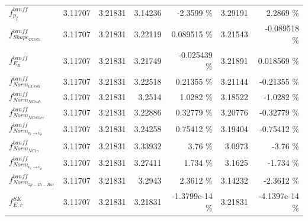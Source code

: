 \begin{table}
\begin{tabular}{| l | r | r | r  r | r  r |}
                                                             $f_{p_{f}}^{banff}$ &         3.11707 & 3.21831 & 3.14236 &         -2.3599 \%  &         3.29191 &          2.2869 \%  \\ 
                                                     $f_{Shape_{CCoth}}^{banff}$ &         3.11707 & 3.21831 & 3.22119 &        0.089515 \%  &         3.21543 &       -0.089518 \%  \\ 
                                                             $f_{E_{B}}^{banff}$ &         3.11707 & 3.21831 & 3.21749 &       -0.025439 \%  &         3.21891 &        0.018569 \%  \\ 
                                                      $f_{Norm_{CCcoh}}^{banff}$ &         3.11707 & 3.21831 & 3.22518 &         0.21355 \%  &         3.21144 &        -0.21355 \%  \\ 
                                                      $f_{Norm_{NCcoh}}^{banff}$ &         3.11707 & 3.21831 & 3.2514 &          1.0282 \%  &         3.18522 &         -1.0282 \%  \\ 
                                                    $f_{Norm_{NCother}}^{banff}$ &         3.11707 & 3.21831 & 3.22886 &         0.32779 \%  &         3.20776 &        -0.32779 \%  \\ 
                                  $f_{Norm_{\nu_e \rightarrow \nu_\mu}}^{banff}$ &         3.11707 & 3.21831 & 3.24258 &         0.75412 \%  &         3.19404 &        -0.75412 \%  \\ 
                                                  $f_{Norm_{NC1\gamma}}^{banff}$ &         3.11707 & 3.21831 & 3.33932 &            3.76 \%  &          3.0973 &           -3.76 \%  \\ 
                      $f_{Norm_{\bar{\nu}_e \rightarrow \bar{\nu}_\mu}}^{banff}$ &         3.11707 & 3.21831 & 3.27411 &           1.734 \%  &          3.1625 &          -1.734 \%  \\ 
                                                     $f_{Norm_{2p-2h-Bar}}^{banff}$ &         3.11707 & 3.21831 & 3.2943 &          2.3612 \%  &         3.14232 &         -2.3612 \%  \\ 
                                                                 $f_{E; r}^{SK}$ &         3.11707 & 3.21831 & 3.21831 &     -1.3799e-14 \%  &         3.21831 &     -4.1397e-14 \%  \\ 

\end{tabular}
\end{table}
